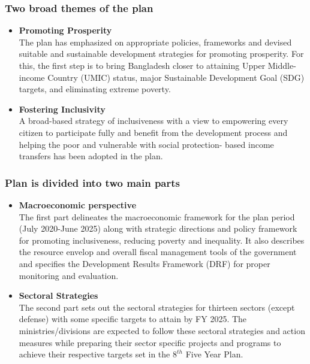 \subsubsection{Two broad themes of the plan}
\begin{itemize}
	\item\textbf{Promoting Prosperity}\\
	The plan has emphasized on appropriate policies, frameworks and devised 
	suitable and sustainable development strategies for promoting prosperity. 
	For this, the first step is to bring Bangladesh closer to attaining 
	Upper Middle-income Country (UMIC) status, major Sustainable Development Goal (SDG) 
	targets, and eliminating extreme poverty.
	
	\item\textbf{Fostering Inclusivity}\\
	A broad-based strategy of inclusiveness with a view to empowering every citizen 
	to participate fully and benefit from the development process and helping the poor and 
	vulnerable with social protection- based income transfers has been adopted in the plan.
\end{itemize}

\subsubsection{Plan is divided into two main parts}
\begin{itemize}
	\item\textbf{Macroeconomic perspective}\\
	The first part delineates the macroeconomic framework for the plan period 
	(July 2020-June 2025) along with strategic directions and policy framework 
	for promoting inclusiveness, reducing poverty and inequality. It also describes 
	the resource envelop and overall fiscal management tools of the government 
	and specifies the Development Results Framework (DRF) for proper monitoring and evaluation.
	
	\item\textbf{Sectoral Strategies}\\
	The second part sets out the sectoral strategies for thirteen sectors (except defense) 
	with some specific targets to attain by FY 2025. The ministries/divisions are expected 
	to follow these sectoral strategies and action measures while preparing their sector 
	specific projects and programs to achieve their respective targets set in the $8^{th}$ Five Year Plan.
\end{itemize}

